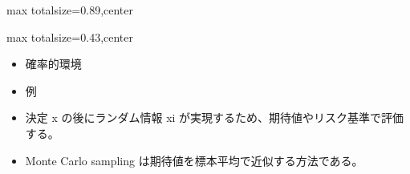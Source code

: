 \begin{minipage}[t]{0.58\textwidth}
\begin{adjustbox}{max totalsize={\textwidth}{0.89\textheight},center}
\begin{minipage}{\textwidth}
\end{minipage}
\end{adjustbox}
\end{minipage}


\clearpage
{}
\begin{minipage}[t]{0.405\textwidth}
\begin{adjustbox}{max totalsize={\textwidth}{0.43\textheight},center}
\begin{minipage}{\textwidth}\scriptsize
{}\begin{itemize}
\item 確率的環境
\item 例
\end{itemize}\begin{itemize}
\item 決定 x の後にランダム情報 xi が実現するため、期待値やリスク基準で評価する。
\item Monte Carlo sampling は期待値を標本平均で近似する方法である。
\end{itemize}
\end{minipage}
\end{adjustbox}
\end{minipage}\hfill
